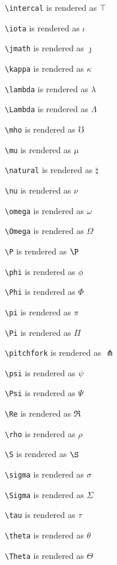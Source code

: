 \texttt{\textbackslash intercal} is rendered as $\intercal$


\texttt{\textbackslash iota} is rendered as $\iota$


\texttt{\textbackslash jmath} is rendered as $\jmath$


\texttt{\textbackslash kappa} is rendered as $\kappa$


\texttt{\textbackslash lambda} is rendered as $\lambda$


\texttt{\textbackslash Lambda} is rendered as $\Lambda$


\texttt{\textbackslash mho} is rendered as $\mho$


\texttt{\textbackslash mu} is rendered as $\mu$


\texttt{\textbackslash natural} is rendered as $\natural$


\texttt{\textbackslash nu} is rendered as $\nu$


\texttt{\textbackslash omega} is rendered as $\omega$


\texttt{\textbackslash Omega} is rendered as $\Omega$


\texttt{\textbackslash P} is rendered as $\P$


\texttt{\textbackslash phi} is rendered as $\phi$


\texttt{\textbackslash Phi} is rendered as $\Phi$


\texttt{\textbackslash pi} is rendered as $\pi$


\texttt{\textbackslash Pi} is rendered as $\Pi$


\texttt{\textbackslash pitchfork} is rendered as $\pitchfork$


\texttt{\textbackslash psi} is rendered as $\psi$


\texttt{\textbackslash Psi} is rendered as $\Psi$


\texttt{\textbackslash Re} is rendered as $\Re$


\texttt{\textbackslash rho} is rendered as $\rho$


\texttt{\textbackslash S} is rendered as $\S$


\texttt{\textbackslash sigma} is rendered as $\sigma$


\texttt{\textbackslash Sigma} is rendered as $\Sigma$


\texttt{\textbackslash tau} is rendered as $\tau$


\texttt{\textbackslash theta} is rendered as $\theta$


\texttt{\textbackslash Theta} is rendered as $\Theta$


